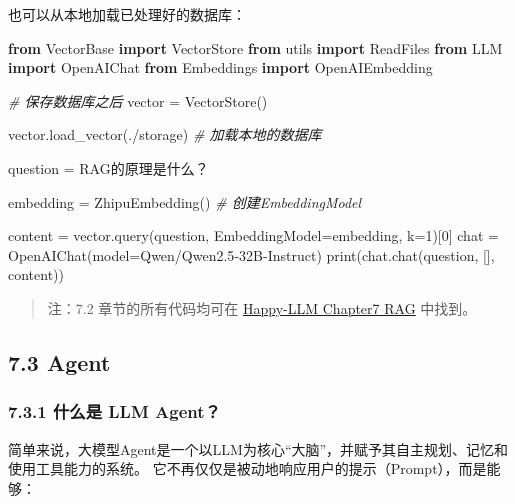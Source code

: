 \documentclass[
]{article}
\newenvironment{Shaded}{}{}
\newcommand{\BuiltInTok}[1]{\textcolor[rgb]{0.00,0.50,0.00}{#1}}
\newcommand{\CommentTok}[1]{\textcolor[rgb]{0.38,0.63,0.69}{\textit{#1}}}
\newcommand{\DecValTok}[1]{\textcolor[rgb]{0.25,0.63,0.44}{#1}}
\newcommand{\ImportTok}[1]{\textcolor[rgb]{0.00,0.50,0.00}{\textbf{#1}}}
\newcommand{\NormalTok}[1]{#1}
\newcommand{\OperatorTok}[1]{\textcolor[rgb]{0.40,0.40,0.40}{#1}}
\newcommand{\StringTok}[1]{\textcolor[rgb]{0.25,0.44,0.63}{#1}}
\begin{document}
也可以从本地加载已处理好的数据库：

\begin{Shaded}
\begin{Highlighting}[]
\ImportTok{from}\NormalTok{ VectorBase }\ImportTok{import}\NormalTok{ VectorStore}
\ImportTok{from}\NormalTok{ utils }\ImportTok{import}\NormalTok{ ReadFiles}
\ImportTok{from}\NormalTok{ LLM }\ImportTok{import}\NormalTok{ OpenAIChat}
\ImportTok{from}\NormalTok{ Embeddings }\ImportTok{import}\NormalTok{ OpenAIEmbedding}

\CommentTok{\# 保存数据库之后}
\NormalTok{vector }\OperatorTok{=}\NormalTok{ VectorStore()}

\NormalTok{vector.load\_vector(}\StringTok{\textquotesingle{}./storage\textquotesingle{}}\NormalTok{) }\CommentTok{\# 加载本地的数据库}

\NormalTok{question }\OperatorTok{=} \StringTok{\textquotesingle{}RAG的原理是什么？\textquotesingle{}}

\NormalTok{embedding }\OperatorTok{=}\NormalTok{ ZhipuEmbedding() }\CommentTok{\# 创建EmbeddingModel}

\NormalTok{content }\OperatorTok{=}\NormalTok{ vector.query(question, EmbeddingModel}\OperatorTok{=}\NormalTok{embedding, k}\OperatorTok{=}\DecValTok{1}\NormalTok{)[}\DecValTok{0}\NormalTok{]}
\NormalTok{chat }\OperatorTok{=}\NormalTok{ OpenAIChat(model}\OperatorTok{=}\StringTok{\textquotesingle{}Qwen/Qwen2.5{-}32B{-}Instruct\textquotesingle{}}\NormalTok{)}
\BuiltInTok{print}\NormalTok{(chat.chat(question, [], content))}
\end{Highlighting}
\end{Shaded}

\begin{quote}
注：7.2 章节的所有代码均可在
\href{https://github.com/datawhalechina/happy-llm/tree/main/docs/chapter7/RAG}{Happy-LLM
Chapter7 RAG} 中找到。
\end{quote}

\subsection{7.3 Agent}\label{agent}

\subsubsection{7.3.1 什么是 LLM
Agent？}\label{ux4ec0ux4e48ux662f-llm-agent}

简单来说，大模型Agent是一个以LLM为核心``大脑''，并赋予其自主规划、记忆和使用工具能力的系统。
它不再仅仅是被动地响应用户的提示（Prompt），而是能够：
\end{document}

